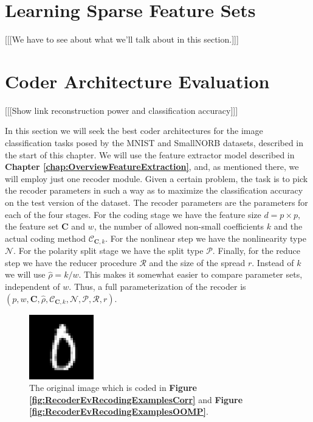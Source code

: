 \documentclass[12pt,a4paper,oneside,english]{UPBThesis}
\newcommand{\hctimes}[2]{{#1}\!\times\!{#2}}
\begin{document}
\section{Learning Sparse Feature Sets}
\label{sec:LearningSparseFeatureSet}

[[[We have to see about what we'll talk about in this section.]]]

\section{Coder Architecture Evaluation}
\label{sec:CoderArchitectureEvaluation}

[[[Show link reconstruction power and classification accuracy]]]

In this section we will seek the best coder architectures for the image classification tasks posed by the MNIST and SmallNORB datasets, described in the start of this chapter. We will use the feature extractor model described in \textbf{Chapter \ref{chap:OverviewFeatureExtraction}}, and, as mentioned there, we will employ just one recoder module. Given a certain problem, the task is to pick the recoder parameters in such a way as to maximize the classification accuracy on the test version of the dataset. The recoder parameters are the parameters for each of the four stages. For the coding stage we have the feature size $d = \hctimes{p}{p}$, the feature set $\textbf{C}$ and $w$, the number of allowed non-small coefficients $k$ and the actual coding method $\mathcal{C}_{\textbf{C},k}$. For the nonlinear step we have the nonlinearity type $\mathcal{N}$. For the polarity split stage we have the split type $\mathcal{P}$. Finally, for the reduce step we have the reducer procedure $\mathcal{R}$ and the size of the spread $r$. Instead of $k$ we will use $\hat{\rho} = k/w$. This makes it somewhat easier to compare parameter sets, independent of $w$. Thus, a full parameterization of the recoder is $(p,w,\textbf{C},\hat{\rho},\mathcal{C}_{\textbf{C},k},\mathcal{N},\mathcal{P},\mathcal{R},r)$.

\begin{figure}
\begin{center}
\includegraphics[width=0.25\textwidth]{thesis_data/recoderev/original_image.png}
\end{center}
\caption{The original image which is coded in \textbf{Figure \ref{fig:RecoderEvRecodingExamplesCorr}} and \textbf{Figure \ref{fig:RecoderEvRecodingExamplesOOMP}}.}
\label{fig:RecoderEvOriginalImage}
\end{figure}
\end{document}
